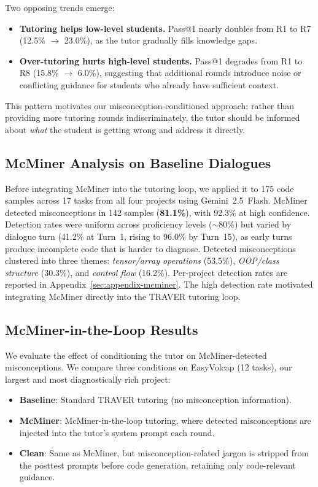 \documentclass[11pt]{article}
\begin{document}
Two opposing trends emerge:
\begin{itemize}
  \item \textbf{Tutoring helps low-level students.} Pass@1 nearly doubles from R1 to R7 (12.5\% $\rightarrow$ 23.0\%), as the tutor gradually fills knowledge gaps.
  \item \textbf{Over-tutoring hurts high-level students.} Pass@1 degrades from R1 to R8 (15.8\% $\rightarrow$ 6.0\%), suggesting that additional rounds introduce noise or conflicting guidance for students who already have sufficient context.
\end{itemize}

This pattern motivates our misconception-conditioned approach: rather than providing more tutoring rounds indiscriminately, the tutor should be informed about \emph{what} the student is getting wrong and address it directly.

\subsection{McMiner Analysis on Baseline Dialogues}
\label{sec:mcminer-analysis}

Before integrating McMiner into the tutoring loop, we applied it to 175 code samples across 17 tasks from all four projects using Gemini~2.5~Flash. McMiner detected misconceptions in 142 samples (\textbf{81.1\%}), with 92.3\% at high confidence. Detection rates were uniform across proficiency levels ($\sim$80\%) but varied by dialogue turn (41.2\% at Turn~1, rising to 96.0\% by Turn~15), as early turns produce incomplete code that is harder to diagnose. Detected misconceptions clustered into three themes: \textit{tensor/array operations} (53.5\%), \textit{OOP/class structure} (30.3\%), and \textit{control flow} (16.2\%). Per-project detection rates are reported in Appendix~\ref{sec:appendix-mcminer}. The high detection rate motivated integrating McMiner directly into the TRAVER tutoring loop.

\subsection{McMiner-in-the-Loop Results}

We evaluate the effect of conditioning the tutor on McMiner-detected misconceptions. We compare three conditions on EasyVolcap (12 tasks), our largest and most diagnostically rich project:
\begin{itemize}
  \item \textbf{Baseline}: Standard TRAVER tutoring (no misconception information).
  \item \textbf{McMiner}: McMiner-in-the-loop tutoring, where detected misconceptions are injected into the tutor's system prompt each round.
  \item \textbf{Clean}: Same as McMiner, but misconception-related jargon is stripped from the posttest prompts before code generation, retaining only code-relevant guidance.
\end{itemize}
\end{document}

